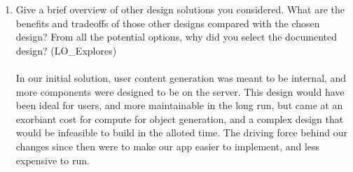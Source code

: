 \documentclass[12pt, titlepage]{article}
\begin{document}
\begin{enumerate}
  \item Give a brief overview of other design solutions you considered.  What
        are the benefits and tradeoffs of those other designs compared with the chosen
        design?  From all the potential options, why did you select the documented design?
        (LO\_Explores)\\ \\
        In our initial solution, user content generation was meant to be internal,
        and more components were designed to be on the server. This design would have been ideal for users, and more maintainable in the long run,
        but came at an exorbiant cost for compute for object generation,
        and a complex design that would be infeasible to build in the alloted time.
        The driving force behind our changes since then were to make our app easier to implement,
        and less expensive to run.
\end{enumerate}
\end{document}
